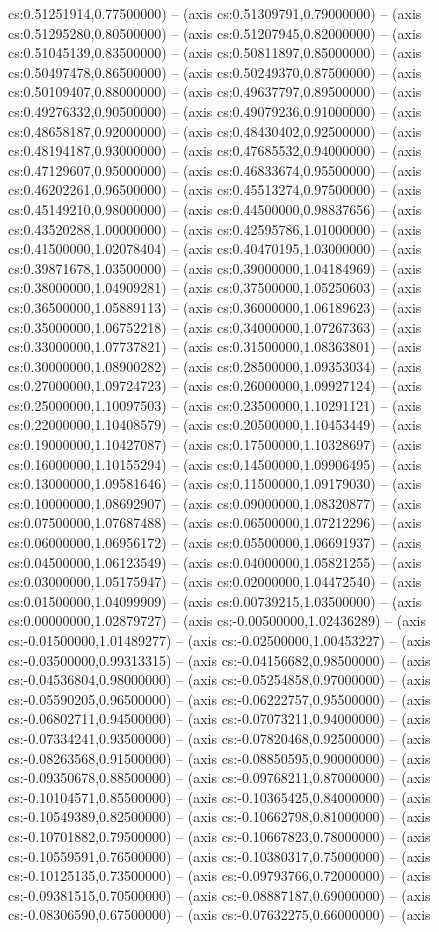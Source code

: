 cs:0.51251914,0.77500000) -- (axis cs:0.51309791,0.79000000) -- (axis cs:0.51295280,0.80500000) -- (axis cs:0.51207945,0.82000000) -- (axis cs:0.51045139,0.83500000) -- (axis cs:0.50811897,0.85000000) -- (axis cs:0.50497478,0.86500000) -- (axis cs:0.50249370,0.87500000) -- (axis cs:0.50109407,0.88000000) -- (axis cs:0.49637797,0.89500000) -- (axis cs:0.49276332,0.90500000) -- (axis cs:0.49079236,0.91000000) -- (axis cs:0.48658187,0.92000000) -- (axis cs:0.48430402,0.92500000) -- (axis cs:0.48194187,0.93000000) -- (axis cs:0.47685532,0.94000000) -- (axis cs:0.47129607,0.95000000) -- (axis cs:0.46833674,0.95500000) -- (axis cs:0.46202261,0.96500000) -- (axis cs:0.45513274,0.97500000) -- (axis cs:0.45149210,0.98000000) -- (axis cs:0.44500000,0.98837656) -- (axis cs:0.43520288,1.00000000) -- (axis cs:0.42595786,1.01000000) -- (axis cs:0.41500000,1.02078404) -- (axis cs:0.40470195,1.03000000) -- (axis cs:0.39871678,1.03500000) -- (axis cs:0.39000000,1.04184969) -- (axis cs:0.38000000,1.04909281) -- (axis cs:0.37500000,1.05250603) -- (axis cs:0.36500000,1.05889113) -- (axis cs:0.36000000,1.06189623) -- (axis cs:0.35000000,1.06752218) -- (axis cs:0.34000000,1.07267363) -- (axis cs:0.33000000,1.07737821) -- (axis cs:0.31500000,1.08363801) -- (axis cs:0.30000000,1.08900282) -- (axis cs:0.28500000,1.09353034) -- (axis cs:0.27000000,1.09724723) -- (axis cs:0.26000000,1.09927124) -- (axis cs:0.25000000,1.10097503) -- (axis cs:0.23500000,1.10291121) -- (axis cs:0.22000000,1.10408579) -- (axis cs:0.20500000,1.10453449) -- (axis cs:0.19000000,1.10427087) -- (axis cs:0.17500000,1.10328697) -- (axis cs:0.16000000,1.10155294) -- (axis cs:0.14500000,1.09906495) -- (axis cs:0.13000000,1.09581646) -- (axis cs:0.11500000,1.09179030) -- (axis cs:0.10000000,1.08692907) -- (axis cs:0.09000000,1.08320877) -- (axis cs:0.07500000,1.07687488) -- (axis cs:0.06500000,1.07212296) -- (axis cs:0.06000000,1.06956172) -- (axis cs:0.05500000,1.06691937) -- (axis cs:0.04500000,1.06123549) -- (axis cs:0.04000000,1.05821255) -- (axis cs:0.03000000,1.05175947) -- (axis cs:0.02000000,1.04472540) -- (axis cs:0.01500000,1.04099909) -- (axis cs:0.00739215,1.03500000) -- (axis cs:0.00000000,1.02879727) -- (axis cs:-0.00500000,1.02436289) -- (axis cs:-0.01500000,1.01489277) -- (axis cs:-0.02500000,1.00453227) -- (axis cs:-0.03500000,0.99313315) -- (axis cs:-0.04156682,0.98500000) -- (axis cs:-0.04536804,0.98000000) -- (axis cs:-0.05254858,0.97000000) -- (axis cs:-0.05590205,0.96500000) -- (axis cs:-0.06222757,0.95500000) -- (axis cs:-0.06802711,0.94500000) -- (axis cs:-0.07073211,0.94000000) -- (axis cs:-0.07334241,0.93500000) -- (axis cs:-0.07820468,0.92500000) -- (axis cs:-0.08263568,0.91500000) -- (axis cs:-0.08850595,0.90000000) -- (axis cs:-0.09350678,0.88500000) -- (axis cs:-0.09768211,0.87000000) -- (axis cs:-0.10104571,0.85500000) -- (axis cs:-0.10365425,0.84000000) -- (axis cs:-0.10549389,0.82500000) -- (axis cs:-0.10662798,0.81000000) -- (axis cs:-0.10701882,0.79500000) -- (axis cs:-0.10667823,0.78000000) -- (axis cs:-0.10559591,0.76500000) -- (axis cs:-0.10380317,0.75000000) -- (axis cs:-0.10125135,0.73500000) -- (axis cs:-0.09793766,0.72000000) -- (axis cs:-0.09381515,0.70500000) -- (axis cs:-0.08887187,0.69000000) -- (axis cs:-0.08306590,0.67500000) -- (axis cs:-0.07632275,0.66000000) -- (axis 
